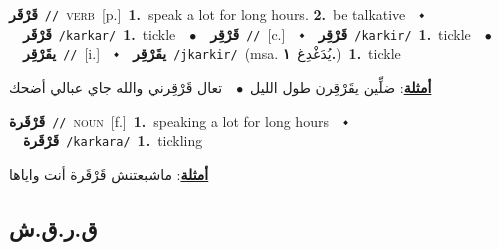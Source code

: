 \documentclass[10pt,a4paper,twoside]{article} %
\begin{document}
\begin{multicols}{2}
{\setlength\topsep{0pt}\textbf{\foreignlanguage{arabic}{قَرْقَر}}\ {\color{gray}\texttt{//}\color{black}}\ \textsc{verb}\ [p.]\ \textbf{1.}~speak a lot for long hours.  \textbf{2.}~be talkative\ \ $\smblkdiamond$\ \ \setlength\topsep{0pt}\textbf{\foreignlanguage{arabic}{قَرْقَر}}\ {\color{gray}\texttt{/karkar/}\color{black}}\ \textbf{1.}~tickle\ \ $\bullet$\ \ \setlength\topsep{0pt}\textbf{\foreignlanguage{arabic}{قَرْقِر}}\ {\color{gray}\texttt{//}\color{black}}\ [c.]\ \ $\smblkdiamond$\ \ \setlength\topsep{0pt}\textbf{\foreignlanguage{arabic}{قَرْقِر}}\ {\color{gray}\texttt{/karkir/}\color{black}}\ \textbf{1.}~tickle\ \ $\bullet$\ \ \setlength\topsep{0pt}\textbf{\foreignlanguage{arabic}{يقَرْقِر}}\ {\color{gray}\texttt{//}\color{black}}\ [i.]\ \ $\smblkdiamond$\ \ \setlength\topsep{0pt}\textbf{\foreignlanguage{arabic}{يقَرْقِر}}\ {\color{gray}\texttt{/jkarkir/}\color{black}}\ \color{gray}(msa. \foreignlanguage{arabic}{يُدَغْدِغ}~\foreignlanguage{arabic}{\textbf{١.}})\color{black}\ \textbf{1.}~tickle\  \begin{flushright}\color{gray}\foreignlanguage{arabic}{\textbf{\underline{\foreignlanguage{arabic}{أمثلة}}}: ضلِّين يقَرْقِرن طول الليل\ $\bullet$\ \  تعال قَرْقِرني والله جاي عبالي أضحك}\end{flushright}\color{black}} \vspace{2mm}

{\setlength\topsep{0pt}\textbf{\foreignlanguage{arabic}{قَرْقَرة}}\ {\color{gray}\texttt{//}\color{black}}\ \textsc{noun}\ [f.]\ \textbf{1.}~speaking a lot for long hours\ \ $\smblkdiamond$\ \ \setlength\topsep{0pt}\textbf{\foreignlanguage{arabic}{قَرْقَرة}}\ {\color{gray}\texttt{/karkara/}\color{black}}\ \textbf{1.}~tickling\  \begin{flushright}\color{gray}\foreignlanguage{arabic}{\textbf{\underline{\foreignlanguage{arabic}{أمثلة}}}: ماشبعتنش قَرْقَرة أنت واياها}\end{flushright}\color{black}} \vspace{2mm}

\vspace{-3mm}
\subsection*{\color{blue}\foreignlanguage{arabic}{ق.ر.ق.ش}\color{blue}{}} 


\end{multicols}
\end{document}

